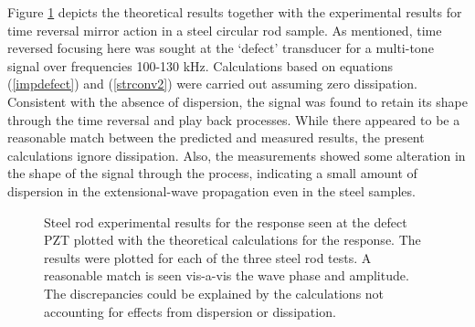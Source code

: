 \documentclass[11pt,letterpaper]{article}%
\begin{document}
Figure \ref{steelThExp} depicts the theoretical results together
with the experimental results for time reversal mirror
action in a steel circular rod sample. As mentioned, time reversed focusing here
was sought at the `defect' transducer for a multi-tone
signal over frequencies 100-130 kHz. Calculations based
on equations (\ref{impdefect}) and (\ref{strconv2}) were carried
out assuming zero dissipation. Consistent with the absence of
dispersion, the signal was found to retain its shape through the
time reversal and play back processes.  While there appeared to be
a reasonable match between the predicted and measured results, the
present calculations ignore dissipation.  Also, the measurements
showed some alteration in the shape of the signal through the
process, indicating a small amount of dispersion in the
extensional-wave propagation even in the steel samples. 

 \begin{figure}
\begin{subfigmatrix}{3}
\end{subfigmatrix}

   \caption[all]
   { \label{steelThExp}
Steel rod experimental results for the response seen at the defect PZT plotted with the theoretical calculations for the response. The results were plotted for each of the three steel rod tests. A reasonable match is seen vis-a-vis the wave phase and amplitude. The discrepancies could be explained by the calculations not accounting for effects from dispersion or dissipation.
 }
 \end{figure}
\end{document}
